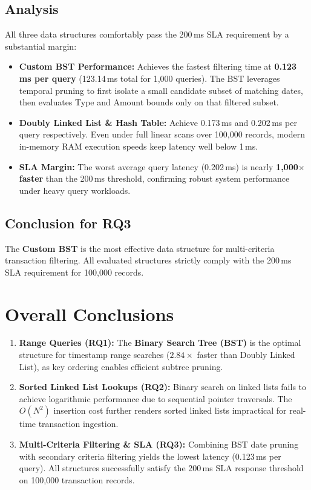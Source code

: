\documentclass[11pt]{article}
\begin{document}
\subsection{Analysis}
All three data structures comfortably pass the 200\,ms SLA requirement by a substantial margin:
\begin{itemize}[leftmargin=1.5em]
    \item \textbf{Custom BST Performance:} Achieves the fastest filtering time at \textbf{0.123\,ms per query} (123.14\,ms total for 1,000 queries). The BST leverages temporal pruning to first isolate a small candidate subset of matching dates, then evaluates Type and Amount bounds only on that filtered subset.
    \item \textbf{Doubly Linked List \& Hash Table:} Achieve 0.173\,ms and 0.202\,ms per query respectively. Even under full linear scans over 100,000 records, modern in-memory RAM execution speeds keep latency well below 1\,ms.
    \item \textbf{SLA Margin:} The worst average query latency (0.202\,ms) is nearly \textbf{1,000$\times$ faster} than the 200\,ms threshold, confirming robust system performance under heavy query workloads.
\end{itemize}

\subsection{Conclusion for RQ3}
The \textbf{Custom BST} is the most effective data structure for multi-criteria transaction filtering. All evaluated structures strictly comply with the 200\,ms SLA requirement for 100,000 records.

\section{Overall Conclusions}
\begin{enumerate}
    \item \textbf{Range Queries (RQ1):} The \textbf{Binary Search Tree (BST)} is the optimal structure for timestamp range searches ($2.84\times$ faster than Doubly Linked List), as key ordering enables efficient subtree pruning.
    \item \textbf{Sorted Linked List Lookups (RQ2):} Binary search on linked lists fails to achieve logarithmic performance due to sequential pointer traversals. The $O(N^2)$ insertion cost further renders sorted linked lists impractical for real-time transaction ingestion.
    \item \textbf{Multi-Criteria Filtering \& SLA (RQ3):} Combining BST date pruning with secondary criteria filtering yields the lowest latency (0.123\,ms per query). All structures successfully satisfy the 200\,ms SLA response threshold on 100,000 transaction records.
\end{enumerate}
\end{document}
